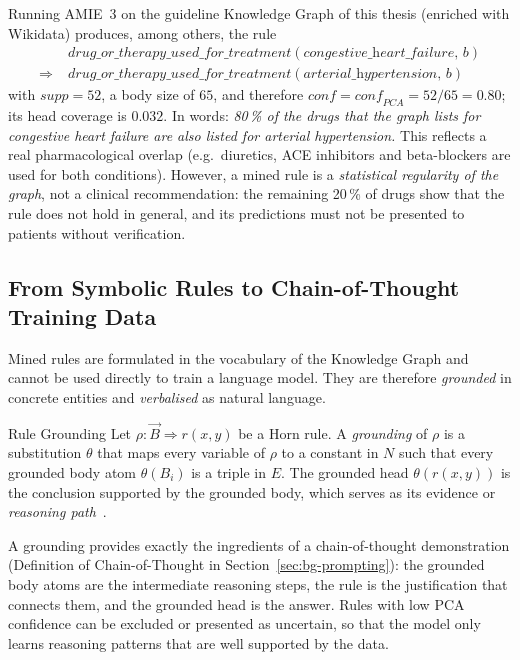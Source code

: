 \begin{bgexample}
Running AMIE~3 on the guideline Knowledge Graph of this thesis (enriched with
Wikidata) produces, among others, the rule
\begin{align*}
  &\mathit{drug\_or\_therapy\_used\_for\_treatment}(\textit{congestive\_heart\_failure},\, b)\\
  \Rightarrow\; &\mathit{drug\_or\_therapy\_used\_for\_treatment}(\textit{arterial\_hypertension},\, b)
\end{align*}
with $\mathit{supp}=52$, a body size of $65$, and therefore
$\mathit{conf} = \mathit{conf}_{\mathit{PCA}} = 52/65 = 0.80$; its head
coverage is $0.032$. In words: \emph{80\,\% of the drugs that the graph
lists for congestive heart failure are also listed for arterial
hypertension.} This reflects a real pharmacological overlap (e.g.\
diuretics, ACE inhibitors and beta-blockers are used for both conditions).
However, a mined rule is a \emph{statistical regularity of the graph}, not a
clinical recommendation: the remaining 20\,\% of drugs show that the rule
does not hold in general, and its predictions must not be presented to
patients without verification.
\end{bgexample}

\subsection{From Symbolic Rules to Chain-of-Thought Training Data}
\label{sec:bg-rules-to-cot}

Mined rules are formulated in the vocabulary of the Knowledge Graph and
cannot be used directly to train a language model. They are therefore
\emph{grounded} in concrete entities and \emph{verbalised} as natural
language.

\begin{bgdefinition}{Rule Grounding}
Let $\rho: \vec{B} \Rightarrow r(x,y)$ be a Horn rule. A \emph{grounding} of
$\rho$ is a substitution $\theta$ that maps every variable of $\rho$ to a
constant in $N$ such that every grounded body atom $\theta(B_i)$ is a
triple in $E$. The grounded head $\theta(r(x,y))$ is the conclusion
supported by the grounded body, which serves as its evidence or
\emph{reasoning path}~\cite{galarraga2015fast,zhou2026breaks}.
\end{bgdefinition}

A grounding provides exactly the ingredients of a chain-of-thought
demonstration (Definition of Chain-of-Thought in
Section~\ref{sec:bg-prompting}): the grounded body atoms are the
intermediate reasoning steps, the rule is the justification that connects
them, and the grounded head is the answer. Rules with low PCA confidence can
be excluded or presented as uncertain, so that the model only learns
reasoning patterns that are well supported by the data.

